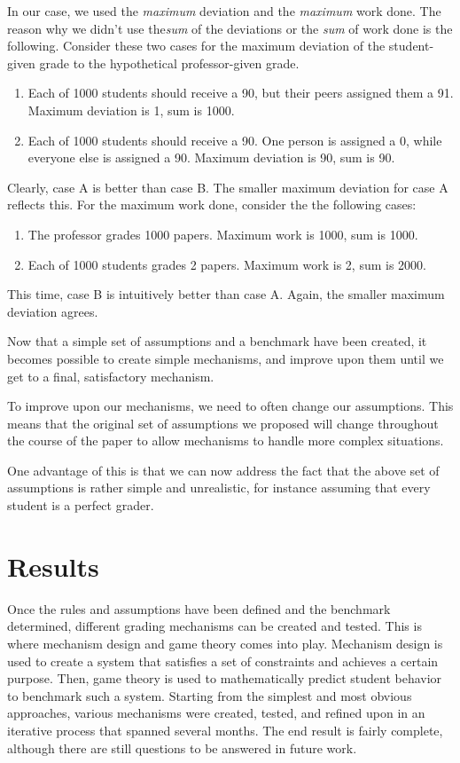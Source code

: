 \documentclass[12pt, Arial]{article}
\begin{document}
In our case, we used the \emph{maximum} deviation and the \emph{maximum} work done. The reason why we didn't use the\emph{sum} of the deviations or the \emph{sum} of work done is the following. Consider these two cases for the maximum deviation of the student-given grade to the hypothetical professor-given grade.
\begin{enumerate}[label=\Alph*]
\item Each of 1000 students should receive a 90, but their peers assigned them a 91. Maximum deviation is 1, sum is 1000.
\item Each of 1000 students should receive a 90. One person is assigned a 0, while everyone else is assigned a 90. Maximum deviation is 90, sum is 90.
\end{enumerate}
Clearly, case A is better than case B. The smaller maximum deviation for case A reflects this.
For the maximum work done, consider the the following cases:
\begin{enumerate}[label=\Alph*]
\item The professor grades 1000 papers. Maximum work is 1000, sum is 1000.
\item Each of 1000 students grades 2 papers. Maximum work is 2, sum is 2000.
\end{enumerate}
This time, case B is intuitively better than case A. Again, the smaller maximum deviation agrees.


Now that a simple set of assumptions and a benchmark have been created, it becomes possible to create simple mechanisms, and improve upon them until we get to a final, satisfactory mechanism.

To improve upon our mechanisms, we need to often change our assumptions. This means that the original set of assumptions we proposed will change throughout the course of the paper to allow mechanisms to handle more complex situations.

One advantage of this is that we can now address the fact that the above set of assumptions is rather simple and unrealistic, for instance assuming that every student is a perfect grader.
\section{Results}
Once the rules and assumptions have been defined and the benchmark determined, different grading mechanisms can be created and tested. This is where mechanism design and game theory comes into play. Mechanism design is used to create a system that satisfies a set of constraints and achieves a certain purpose. Then, game theory is used to mathematically predict student behavior to benchmark such a system. Starting from the simplest and most obvious approaches, various mechanisms were created, tested, and refined upon in an iterative process that spanned several months. The end result is fairly complete, although there are still questions to be answered in future work.
\end{document}
